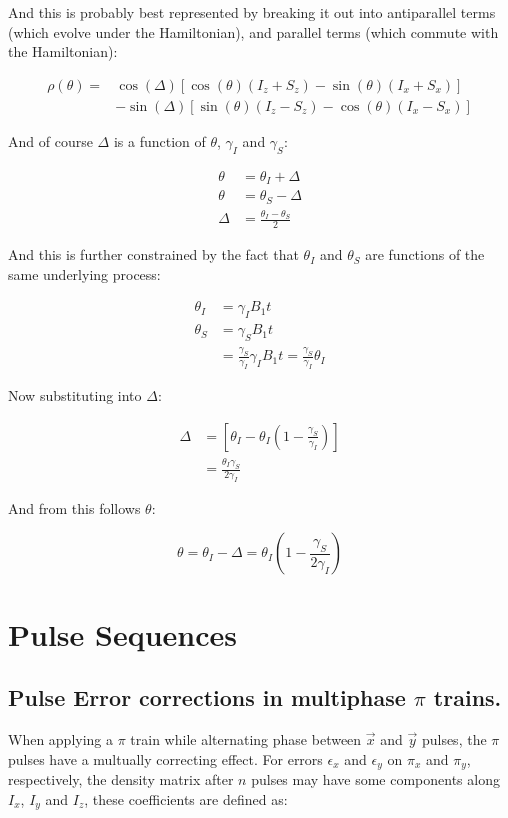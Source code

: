 \documentclass[../PaulGanssle-Thesis.tex]{subfiles}
\begin{document}
And this is probably best represented by breaking it out into antiparallel terms (which evolve under the Hamiltonian), and parallel terms (which commute with the Hamiltonian):

\begin{align}
\rho(\theta) = & \cos(\Delta)\left[\cos(\theta)(I_{z} + S_{z}) - \sin(\theta)(I_{x} + S_{x})\right] \\ 
			& - \sin(\Delta)\left[\sin(\theta)(I_{z} - S_{z}) - \cos(\theta)(I_{x} - S_{x})\right]
\end{align}

And of course $\Delta$ is a function of $\theta$, $\gamma_{I}$ and $\gamma_{S}$:

\begin{align}
\theta & = \theta_{I} + \Delta \\
\theta & = \theta_{S} - \Delta \\
\Delta & = \frac{\theta_{I} - \theta_{S}}{2}
\end{align}

And this is further constrained by the fact that $\theta_{I}$ and $\theta_{S}$ are functions of the same underlying process:

\begin{align}
\theta_{I} & = \gamma_{I}B_{1}t \\
\theta_{S} & = \gamma_{S}B_{1}t \\
& = \frac{\gamma_{S}}{\gamma_{I}}\gamma_{I}B_{1}t = \frac{\gamma_{S}}{\gamma_{I}}\theta_{I}
\end{align}

Now substituting into $\Delta$:

\begin{align}
\Delta & = \left[\theta_{I} - \theta_{I}\left(1 - \frac{\gamma_{S}}{\gamma_{I}}\right)\right] \\
& = \frac{\theta_{I}\gamma_{S}}{2\gamma_{I}}
\end{align}

And from this follows $\theta$:

\begin{equation}
\theta = \theta_{I} - \Delta = \theta_{I}\left(1- \frac{\gamma_{S}}{2\gamma_{I}}\right)
\end{equation}

\section{Pulse Sequences}
\subsection{Pulse Error corrections in multiphase $\pi$ trains.}
\label{proofs.pulses.multiphasepi}
When applying a $\pi$ train while alternating phase between $\vec{x}$ and $\vec{y}$ pulses, the $\pi$ pulses have a multually correcting effect. For errors $\epsilon_{x}$ and $\epsilon_{y}$ on $\pi_{x}$ and $\pi_{y}$, respectively, the density matrix after $n$ pulses may have some components along $I_{x}$, $I_{y}$ and $I_{z}$, these coefficients are defined as:
\end{document}
